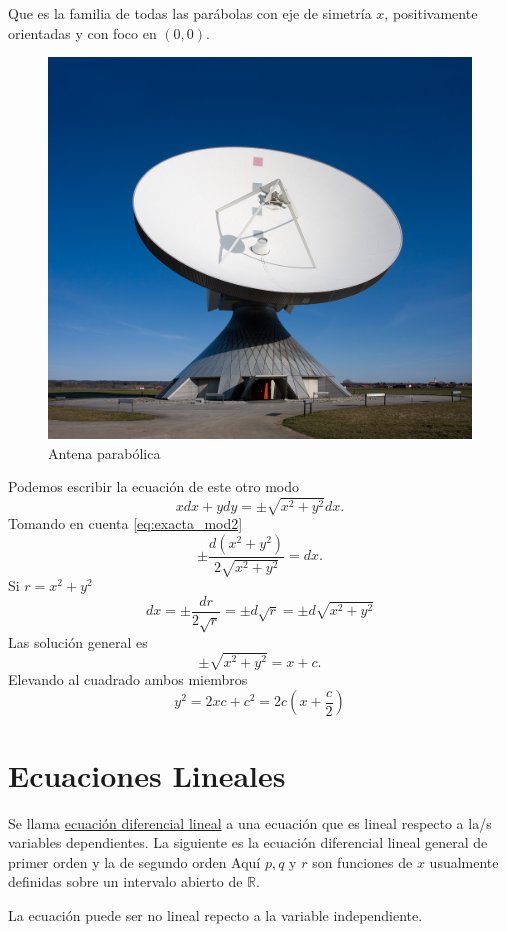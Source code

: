 \documentclass{article}
\newcommand{\rr}{\mathbb{R}}
\begin{document}
Que es la familia de todas las parábolas con eje de simetría $x$, positivamente orientadas y con foco en $(0,0)$.
 \begin{figure}
 \begin{center}
 \includegraphics[scale=.1]{imagenes/antena.jpg}
 \end{center}
\caption{Antena parabólica}
\end{figure}
Podemos escribir la ecuación de este otro modo
\[xdx+ydy=\pm\sqrt{x^2+y^2}dx.\]
Tomando en cuenta \eqref{eq:exacta_mod2}
\[\pm\frac{d(x^2+y^2)}{2\sqrt{x^2+y^2}}=dx.\]
Si $r=x^2+y^2$
\[dx=\pm\frac{dr}{2\sqrt{r}}=\pm d\sqrt{r}=\pm d\sqrt{x^2+y^2}\]
Las solución general es
\[\pm\sqrt{x^2+y^2}=x+c.\]
Elevando al cuadrado ambos miembros
\[y^2=2xc+c^2=2c\left(x+\frac{c}{2}\right)\]
\section{Ecuaciones Lineales}
\begin{definicion} Se llama \href{http://es.wikipedia.org/wiki/Ecuación_diferencial_lineal}{ecuación diferencial lineal} a una ecuación que es lineal
respecto a   la/s variables
dependientes. La siguiente es la ecuación diferencial lineal general de primer orden
y la  de segundo orden
Aquí $p,q$ y $r$ son funciones de $x$ usualmente definidas sobre un intervalo abierto de $\rr$.
\end{definicion}
La ecuación puede ser no lineal repecto a la variable independiente.
\end{document}
